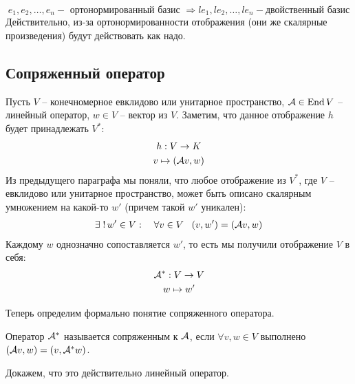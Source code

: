 \begin{notice}
    \[ e_1, e_2, \dots, e_n - \text{ ортонормированный базис } \Rightarrow le_1, le_2, \dots, le_n - \text{двойственный базис} \]
    Действительно, из-за ортонормированности отображения (они же скалярные произведения) будут действовать как надо.
\end{notice}

\subsection{Сопряженный оператор}
Пусть $V$ -- конечномерное евклидово или унитарное пространство, $\mathcal{A} \in \operatorname{End} V$ -- линейный оператор, $w \in V$ -- вектор из $V$.
Заметим, что данное отображение $h$ будет принадлежать $V^*$: \begin{gather*}
    h: V \to K \\
    v \mapsto (\mathcal{A} v, w)
\end{gather*}
Из предыдущего параграфа мы поняли, что любое отображение из $V^*$, где $V$ -- евклидово или унитарное пространство, может быть описано скалярным умножением на какой-то $w'$ (причем такой $w'$ уникален): \begin{gather*}
    \exists \; ! \, w' \in V : \quad \forall v \in V \;\;\; (v, w') = (\mathcal{A} v, w)
\end{gather*} 
Каждому $w$ однозначно сопоставляется $w'$, то есть мы получили отображение $V$ в себя: \begin{gather*}
    \mathcal{A}^*: V \to V \\
    w \mapsto w'
\end{gather*}

Теперь определим формально понятие сопряженного оператора.
\begin{conj}
    Оператор $\mathcal{A}^*$ называется сопряженным к $\mathcal{A}$, если $\forall v, w \in V$ выполнено $(\mathcal{A} v, w) = (v, \mathcal{A}^*w)$.
\end{conj}

\vspace*{5mm}

Докажем, что это действительно линейный оператор.

